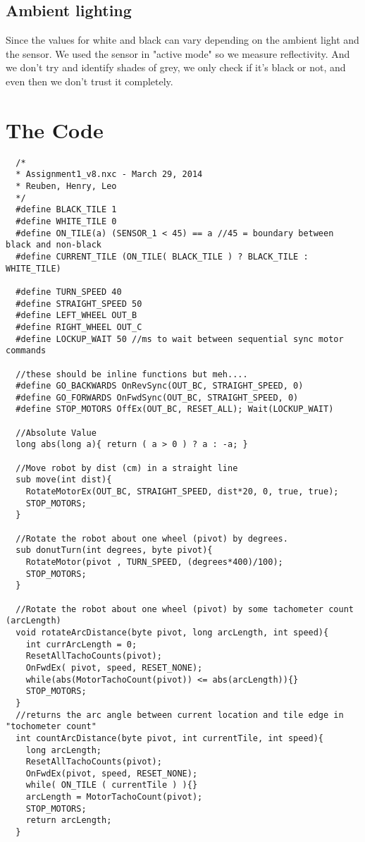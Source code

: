 \documentclass[a4paper,11pt]{article}
\begin{document}
\subsection{Ambient lighting}
Since the values for white and black can vary depending on the ambient light and the sensor.
We used the sensor in "active mode" so we measure reflectivity. And we don't try and identify shades of grey, we only check if it's black or not, and even then we don't trust it completely.

\clearpage
\section {The Code}

\begin{lstlisting}
  /*
  * Assignment1_v8.nxc - March 29, 2014
  * Reuben, Henry, Leo
  */
  #define BLACK_TILE 1
  #define WHITE_TILE 0
  #define ON_TILE(a) (SENSOR_1 < 45) == a //45 = boundary between black and non-black
  #define CURRENT_TILE (ON_TILE( BLACK_TILE ) ? BLACK_TILE : WHITE_TILE)

  #define TURN_SPEED 40
  #define STRAIGHT_SPEED 50
  #define LEFT_WHEEL OUT_B
  #define RIGHT_WHEEL OUT_C
  #define LOCKUP_WAIT 50 //ms to wait between sequential sync motor commands

  //these should be inline functions but meh....
  #define GO_BACKWARDS OnRevSync(OUT_BC, STRAIGHT_SPEED, 0)
  #define GO_FORWARDS OnFwdSync(OUT_BC, STRAIGHT_SPEED, 0)
  #define STOP_MOTORS OffEx(OUT_BC, RESET_ALL); Wait(LOCKUP_WAIT)

  //Absolute Value
  long abs(long a){ return ( a > 0 ) ? a : -a; }

  //Move robot by dist (cm) in a straight line
  sub move(int dist){
    RotateMotorEx(OUT_BC, STRAIGHT_SPEED, dist*20, 0, true, true);
    STOP_MOTORS;
  }

  //Rotate the robot about one wheel (pivot) by degrees.
  sub donutTurn(int degrees, byte pivot){
    RotateMotor(pivot , TURN_SPEED, (degrees*400)/100);
    STOP_MOTORS;
  }

  //Rotate the robot about one wheel (pivot) by some tachometer count (arcLength)
  void rotateArcDistance(byte pivot, long arcLength, int speed){
    int currArcLength = 0;
    ResetAllTachoCounts(pivot);
    OnFwdEx( pivot, speed, RESET_NONE);
    while(abs(MotorTachoCount(pivot)) <= abs(arcLength)){}
    STOP_MOTORS;
  }
  //returns the arc angle between current location and tile edge in "tochometer count"
  int countArcDistance(byte pivot, int currentTile, int speed){
    long arcLength;
    ResetAllTachoCounts(pivot);
    OnFwdEx(pivot, speed, RESET_NONE);
    while( ON_TILE ( currentTile ) ){}
    arcLength = MotorTachoCount(pivot);
    STOP_MOTORS;
    return arcLength;
  }


\end{lstlisting}
\end{document}

